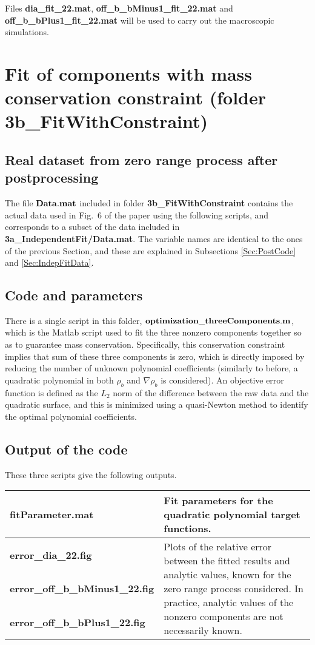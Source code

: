\documentclass[authoryear,3p,11pt]{elsarticle}
\begin{document}
Files {\bf dia\_fit\_22.mat}, {\bf off\_b\_bMinus1\_fit\_22.mat} and {\bf off\_b\_bPlus1\_fit\_22.mat} will be used to carry out the macroscopic simulations.

\section{Fit of components with mass conservation constraint (folder 3b\_FitWithConstraint)} \label{Sec:FitConstraint}

\subsection{Real dataset from zero range process after postprocessing} 

The file $\bf Data.mat$ included in folder {\bf 3b\_FitWithConstraint} contains the actual data used in Fig.~6 of the paper using the following scripts, and corresponds to a subset of the data included in  {\bf3a\_IndependentFit/Data.mat}. The variable names are identical to the ones of the previous Section, and these are explained in Subsections \ref{Sec:PostCode} and \ref{Sec:IndepFitData}. 

\subsection{Code and parameters} 
There is a single script in this folder, $\bf optimization\_threeComponents.m$, which is the Matlab script used to fit the three nonzero components together so as to guarantee mass conservation. Specifically, this conservation constraint implies that sum of these three components is zero, which is directly imposed by reducing the number of unknown polynomial coefficients (similarly to before, a quadratic polynomial in both $\rho_b$ and $\nabla \rho_b$ is considered). An objective error function is defined as the $L_2$ norm of the difference between the raw data and the quadratic surface, and this is minimized using a quasi-Newton method to identify the optimal polynomial coefficients.

\subsection{Output of the code} 
These three scripts give the following outputs. 

\begin{center}
\begin{tabular}{ |l|p{105mm}| }
\hline
{\bf fitParameter.mat} & Fit parameters for the quadratic polynomial target functions.\\
\hline
{\bf error\_dia\_22.fig} & \multirow{3}{105mm}{Plots of the relative error between the fitted results and analytic values, known for the zero range process considered. In practice, analytic values of the nonzero components are not necessarily known.} \\
{\bf error\_off\_b\_bMinus1\_22.fig}  & \\ 
{\bf error\_off\_b\_bPlus1\_22.fig} &  \\[6mm]
\hline
\end{tabular}
\end{center}
\end{document}
